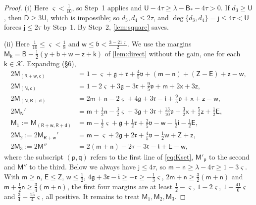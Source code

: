 \documentclass[11pt,colorlinks]{charlie}
\begin{document}
\begin{proof}
(i) Here $\varsigma<\frac1{10}$, so Step~1 applies and $\mathsf U-4\tau\ge\lambda-\mathsf B_*-4\tau>0$. If $d_3\ge\mathsf U$, then $\mathsf D\ge3\mathsf U$, which is impossible; so $d_3,d_4\le2\tau$, and $\deg\{d_3,d_4\}=\mathsf j\le4\tau<\mathsf U$ forces $\mathsf j\le2\tau$ by Step~1. By Step~2, \cref{lem:square} saves.

(ii) Here $\frac1{10}\le\varsigma<\frac18$ and $\mathsf w\le\mathfrak b<\frac{3-21\varsigma}2$. We use the margins $\mathsf M_{\mathsf k}=\mathsf B-\frac12(\mathsf y+\mathsf b+\mathsf w-\mathsf z+\mathsf k)$ of \cref{lem:direct} without the gain, one for each $\mathsf k\in\mathcal K$. Expanding (\S6),
\[
 \begin{aligned}
 2\mathsf M_{(\mathsf R+\mathsf w,\mathsf c)}&=1-\varsigma+\mathfrak g+\mathfrak r+\tfrac45\mathfrak v+(\mathsf m-\mathsf n)+(\mathsf Z-\mathsf E)+\mathsf z-\mathsf w,\\
 2\mathsf M_{(\mathsf N,\mathsf c)}&=1-2\varsigma+3\mathfrak g+3\mathfrak r+\tfrac95\mathfrak v+\mathsf m+2\mathsf x+3\mathsf z,\\
 2\mathsf M_{(\mathsf N,\mathsf R+\mathsf d)}&=2\mathsf m+\mathsf n-2\varsigma+4\mathfrak g+3\mathfrak r-\mathfrak i+\tfrac95\mathfrak v+\mathsf x+\mathsf z-\mathsf w,\\
 2\mathsf M_{\mathsf N}'&=\mathsf m+\tfrac12\mathsf n-\tfrac32\varsigma+3\mathfrak g+3\mathfrak r+\tfrac{13}{10}\mathfrak v+\tfrac32\mathsf x+\tfrac52\mathsf z+\tfrac12\mathsf E,\\
 \mathsf M_1:=\mathsf M_{(\mathsf R+\mathsf w,\mathsf R+\mathsf d)}&=\mathsf m-\tfrac12\varsigma+\mathfrak g+\tfrac12\mathfrak r+\tfrac25\mathfrak v-\mathsf w-\tfrac12\mathfrak i-\tfrac12\mathsf E,\\
 2\mathsf M_2:=2\mathsf M_{\mathsf R+\mathsf w}'&=\mathsf m-\varsigma+2\mathfrak g+2\mathfrak r+\tfrac45\mathfrak v-\tfrac12\mathsf w+\mathsf Z+\mathsf z,\\
 2\mathsf M_3:=2\mathsf M''&=2(\mathsf m+\mathsf n)-2\tau-3\mathfrak r-\mathfrak i+\mathsf E-\mathsf w,
 \end{aligned}
\]
where the subscript $(\mathsf p,\mathsf q)$ refers to the first line of \eqref{eq:Kset}, $\mathsf M'_{\mathsf p}$ to the second and $\mathsf M''$ to the third. Below we always have $\mathsf j\le4\tau$, so $\mathsf m+\mathsf n\ge\lambda-4\tau\ge1-3\varsigma$. With $\mathsf m\ge\mathsf n$, $\mathsf E\le\mathsf Z$, $\mathsf w\le\frac12$, $4\mathfrak g+3\mathfrak r-\mathfrak i\ge-\mathfrak r\ge-\frac13\varsigma$, $2\mathsf m+\mathsf n\ge\frac32(\mathsf m+\mathsf n)$ and $\mathsf m+\frac12\mathsf n\ge\frac34(\mathsf m+\mathsf n)$, the first four margins are at least $\frac12-\varsigma$, $1-2\varsigma$, $1-\frac{41}6\varsigma$ and $\frac34-\frac{15}4\varsigma$, all positive. It remains to treat $\mathsf M_1,\mathsf M_2,\mathsf M_3$.


\end{proof}
\end{document}
